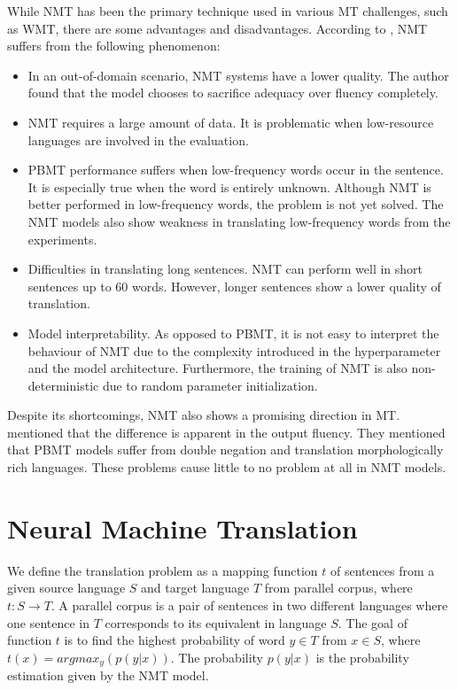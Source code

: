 While NMT has been the primary technique used in various MT challenges, such as WMT, there are some advantages and disadvantages. According to \cite{koehn2017nmt}, NMT suffers from the following phenomenon:
\begin{itemize}
    \item In an out-of-domain scenario, NMT systems have a lower quality. The author found that the model chooses to sacrifice adequacy over fluency completely.

    \item NMT requires a large amount of data. It is problematic when low-resource languages are involved in the evaluation.

    \item PBMT performance suffers when low-frequency words occur in the sentence. It is especially true when the word is entirely unknown. Although NMT is better performed in low-frequency words, the problem is not yet solved. The NMT models also show weakness in translating low-frequency words from the experiments.

    \item Difficulties in translating long sentences. NMT can perform well in short sentences up to 60 words. However, longer sentences show a lower quality of translation.

    \item Model interpretability. As opposed to PBMT, it is not easy to interpret the behaviour of NMT due to the complexity introduced in the hyperparameter and the model architecture. Furthermore, the training of NMT is also non-deterministic due to random parameter initialization.
\end{itemize}

Despite its shortcomings, NMT also shows a promising direction in MT. \cite{machavcek2018enriching} mentioned that the difference is apparent in the output fluency. They mentioned that PBMT models suffer from double negation and translation morphologically rich languages. These problems cause little to no problem at all in NMT models.

\section{Neural Machine Translation}
\label{sec:bm_nmt}
We define the translation problem as a mapping function $t$ of sentences from a given source language $S$ and target language $T$ from parallel corpus, where $t : S \rightarrow T$. A parallel corpus is a pair of sentences in two different languages where one sentence in $T$ corresponds to its equivalent in language $S$. The goal of function $t$ is to find the highest probability of word $y \in T$ from $x \in S$, where $t(x) = argmax_y(p(y|x))$. The probability $p(y|x)$ is the probability estimation given by the NMT model.

